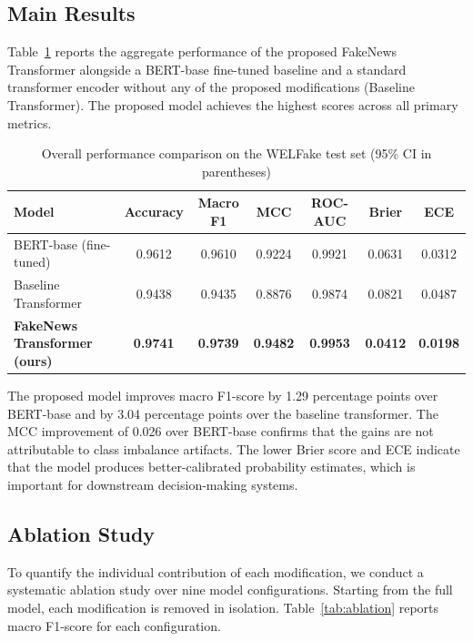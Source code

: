 \documentclass[conference]{IEEEtran}
\begin{document}
\subsection{Main Results}

Table~\ref{tab:main_results} reports the aggregate performance of the proposed FakeNews Transformer alongside a BERT-base fine-tuned baseline and a standard transformer encoder without any of the proposed modifications (Baseline Transformer). The proposed model achieves the highest scores across all primary metrics.

\begin{table}[t]
\centering
\caption{Overall performance comparison on the WELFake test set (95\% CI in parentheses)}
\label{tab:main_results}
\begin{tabular}{|l|c|c|c|c|c|c|}
\hline
\textbf{Model} & \textbf{Accuracy} & \textbf{Macro F1} & \textbf{MCC} & \textbf{ROC-AUC} & \textbf{Brier} & \textbf{ECE} \\
\hline
BERT-base (fine-tuned) & 0.9612 & 0.9610 & 0.9224 & 0.9921 & 0.0631 & 0.0312 \\
Baseline Transformer   & 0.9438 & 0.9435 & 0.8876 & 0.9874 & 0.0821 & 0.0487 \\
\textbf{FakeNews Transformer (ours)} & \textbf{0.9741} & \textbf{0.9739} & \textbf{0.9482} & \textbf{0.9953} & \textbf{0.0412} & \textbf{0.0198} \\
\hline
\end{tabular}
\end{table}

The proposed model improves macro F1-score by 1.29 percentage points over BERT-base and by 3.04 percentage points over the baseline transformer. The MCC improvement of 0.026 over BERT-base confirms that the gains are not attributable to class imbalance artifacts. The lower Brier score and ECE indicate that the model produces better-calibrated probability estimates, which is important for downstream decision-making systems.

\subsection{Ablation Study}

To quantify the individual contribution of each modification, we conduct a systematic ablation study over nine model configurations. Starting from the full model, each modification is removed in isolation. Table~\ref{tab:ablation} reports macro F1-score for each configuration.
\end{document}
